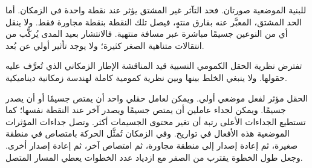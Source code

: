 \begin{classroomqa}
\end{classroomqa}

للبنية الموضعية صورتان. فحد التآثر غير المشتق يؤثر عند نقطة واحدة في الزمكان. أما الحد المشتق، المعبَّر عنه بفارق منتهٍ، فيصل تلك النقطة بنقطة مجاورة فقط. ولا ينقل أي من النوعين جسيمًا مباشرة عبر مسافة منتهية. فالانتشار بعيد المدى يُركَّب من انتقالات متناهية الصغر كثيرة؛ ولا يوجد تأثير أولي عن بُعد.

\begin{classroomqa}
\end{classroomqa}

\begin{classroomqa}
\end{classroomqa}

تفترض نظرية الحقل الكمومي النسبية قيد المناقشة الإطار الزمكاني الذي تُعرَّف عليه حقولها. ولا ينبغي الخلط بينها وبين نظرية كمومية كاملة لهندسة زمكانية ديناميكية.

\begin{classroomqa}
\end{classroomqa}

الحقل مؤثر لفعل موضعي أولي. ويمكن لعامل حقلي واحد أن يمتص جسيمًا أو أن يصدر جسيمًا. ويمكن لجداء عاملين أن يمتص جسيمًا ويصدر آخر عند النقطة نفسها؛ كما تستطيع الجداءات الأعلى رتبة أن تغير محتوى الجسيمات أكثر. وتصل جداءات المؤثرات الموضعية هذه الأفعال في تواريخ. وفي الزمكان تُمثَّل الحركة بامتصاص في منطقة صغيرة، ثم إعادة إصدار إلى منطقة مجاورة، ثم امتصاص آخر، ثم إعادة إصدار أخرى. وجعل طول الخطوة يقترب من الصفر مع ازدياد عدد الخطوات يعطي المسار المتصل.


